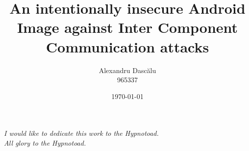 \documentclass[11pt, a4paper, twoside, openside]{custard}
\begin{document}
	
	\title{An intentionally insecure Android Image against Inter Component Communication attacks}
	\author{Alexandru Dascălu\protect\\{\normalsize 965337}}
	
	
	
	\date{\today}
	
	\frontmatter%
	\maketitle
	\declaration
	\cleardoublepage
	
	\begin{vplace}[0.7]
		\begin{large}
			\begin{center}
				\textit{I would like to dedicate this work to the Hypnotoad.\\All glory to the Hypnotoad.}
			\end{center}
		\end{large}
	\end{vplace}
\end{document}
